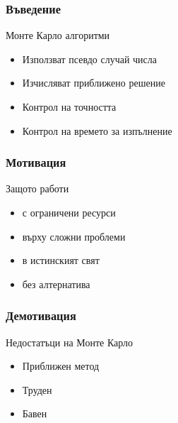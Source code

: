 \begin{frame}
  \frametitle{Въведение}
  Монте Карло алгоритми\pause
  \begin{itemize}
  \item Използват псевдо случай числа\pause
  \item Изчисляват приближено решение\pause
  \item Контрол на точността\pause
  \item Контрол на времето за изпълнение %
  \end{itemize}
\end{frame}

\begin{frame}
  \frametitle{Мотивация}
  \pause
  Защото работи\pause
  \begin{itemize}
  \item с ограничени ресурси\pause
  \item върху сложни проблеми\pause
  \item в истинският свят\pause
  \item без алтернатива
  \end{itemize}
\end{frame}
\begin{frame}
  \frametitle{Демотивация}
  Недостатъци на Монте Карло\pause
  \begin{itemize}
  \item Приближен метод\pause
  \item Труден\pause
  \item Бавен 
  \end{itemize}
\end{frame}


